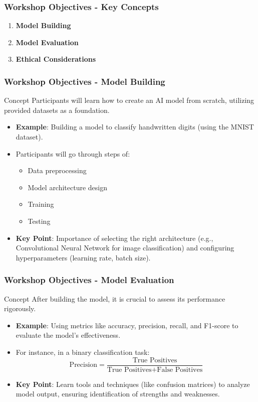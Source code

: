 \documentclass{beamer}
\begin{document}
\begin{frame}[fragile]
    \frametitle{Workshop Objectives - Key Concepts}
    \begin{enumerate}
        \item \textbf{Model Building}
        \item \textbf{Model Evaluation}
        \item \textbf{Ethical Considerations}
    \end{enumerate}
\end{frame}

\begin{frame}[fragile]
    \frametitle{Workshop Objectives - Model Building}
    \begin{block}{Concept}
        Participants will learn how to create an AI model from scratch, utilizing provided datasets as a foundation.
    \end{block}
    \begin{itemize}
        \item \textbf{Example}: Building a model to classify handwritten digits (using the MNIST dataset).
        \item Participants will go through steps of:
            \begin{itemize}
                \item Data preprocessing
                \item Model architecture design
                \item Training
                \item Testing
            \end{itemize}
        \item \textbf{Key Point}: Importance of selecting the right architecture (e.g., Convolutional Neural Network for image classification) and configuring hyperparameters (learning rate, batch size).
    \end{itemize}
\end{frame}

\begin{frame}[fragile]
    \frametitle{Workshop Objectives - Model Evaluation}
    \begin{block}{Concept}
        After building the model, it is crucial to assess its performance rigorously.
    \end{block}
    \begin{itemize}
        \item \textbf{Example}: Using metrics like accuracy, precision, recall, and F1-score to evaluate the model’s effectiveness.
        \item For instance, in a binary classification task:
        \begin{equation}
            \text{Precision} = \frac{\text{True Positives}}{\text{True Positives} + \text{False Positives}}
        \end{equation}
        \item \textbf{Key Point}: Learn tools and techniques (like confusion matrices) to analyze model output, ensuring identification of strengths and weaknesses.
    \end{itemize}
\end{frame}
\end{document}

